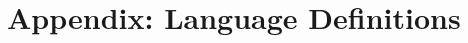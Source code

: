 \chapter{Appendix: Language Definitions}
\label{app:lang-defs}

\newpage

\newpage

\newpage

\newpage

